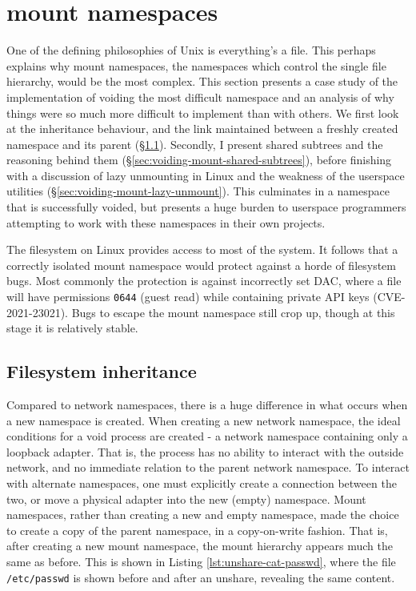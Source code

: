 \documentclass[12pt,a4paper,twoside]{report}
\begin{document}
\section{mount namespaces}
\label{sec:voiding-mount}

One of the defining philosophies of Unix is everything's a file. This perhaps explains why mount namespaces, the namespaces which control the single file hierarchy, would be the most complex. This section presents a case study of the implementation of voiding the most difficult namespace and an analysis of why things were so much more difficult to implement than with others. We first look at the inheritance behaviour, and the link maintained between a freshly created namespace and its parent (§\ref{sec:voiding-mount-inherited}). Secondly, I present shared subtrees and the reasoning behind them (§\ref{sec:voiding-mount-shared-subtrees}), before finishing with a discussion of lazy unmounting in Linux and the weakness of the userspace utilities (§\ref{sec:voiding-mount-lazy-unmount}). This culminates in a namespace that is successfully voided, but presents a huge burden to userspace programmers attempting to work with these namespaces in their own projects.

The filesystem on Linux provides access to most of the system. It follows that a correctly isolated mount namespace would protect against a horde of filesystem bugs. Most commonly the protection is against incorrectly set DAC, where a file will have permissions \texttt{0644} (guest read) while containing private API keys (CVE-2021-23021). Bugs to escape the mount namespace still crop up, though at this stage it is relatively stable.

\subsection{Filesystem inheritance}
\label{sec:voiding-mount-inherited}

Compared to network namespaces, there is a huge difference in what occurs when a new namespace is created. When creating a new network namespace, the ideal conditions for a void process are created - a network namespace containing only a loopback adapter. That is, the process has no ability to interact with the outside network, and no immediate relation to the parent network namespace. To interact with alternate namespaces, one must explicitly create a connection between the two, or move a physical adapter into the new (empty) namespace. Mount namespaces, rather than creating a new and empty namespace, made the choice to create a copy of the parent namespace, in a copy-on-write fashion. That is, after creating a new mount namespace, the mount hierarchy appears much the same as before. This is shown in Listing \ref{lst:unshare-cat-passwd}, where the file \texttt{/etc/passwd} is shown before and after an unshare, revealing the same content.
\end{document}
